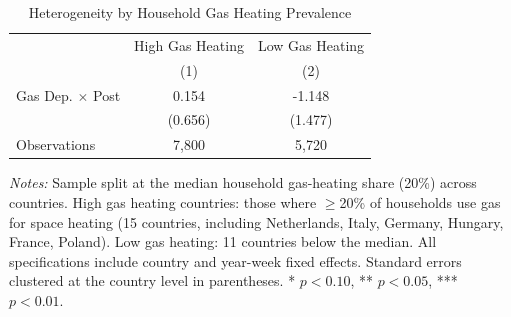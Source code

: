 \begin{table}[!htbp]
\centering
\caption{Heterogeneity by Household Gas Heating Prevalence}
\label{tab:heterogeneity}
\begin{tabular}{lcc}
\hline\hline
 & High Gas Heating & Low Gas Heating \\
 & (1) & (2) \\
\hline
\addlinespace
Gas Dep. $\times$ Post & 0.154 & -1.148 \\
 & (0.656) & (1.477) \\
\addlinespace
Observations & 7,800 & 5,720 \\
\hline\hline
\end{tabular}
\begin{tablenotes}[flushleft]
\small
\item \textit{Notes:} Sample split at the median household gas-heating share (20\%) across countries. High gas heating countries: those where $\geq$20\% of households use gas for space heating (15 countries, including Netherlands, Italy, Germany, Hungary, France, Poland). Low gas heating: 11 countries below the median. All specifications include country and year-week fixed effects. Standard errors clustered at the country level in parentheses. * $p<0.10$, ** $p<0.05$, *** $p<0.01$.
\end{tablenotes}
\end{table}

